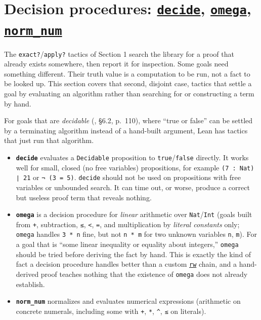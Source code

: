 \section{\texorpdfstring{Decision procedures: \href{https://lean-lang.org/doc/reference/latest/Tactic-Proofs/Tactic-Reference/}{\texttt{decide}}, \href{https://lean-lang.org/doc/reference/latest/Tactic-Proofs/Tactic-Reference/}{\texttt{omega}}, \href{https://lean-lang.org/doc/reference/latest/Tactic-Proofs/Tactic-Reference/}{\texttt{norm\_num}}}{Decision procedures: decide, omega, norm\_num}}\label{sec:13-working-efficiently:02-decision-procedures:1}

The \texttt{exact?}/\texttt{apply?} tactics of Section 1 search the library for a proof that already exists somewhere, then report it for inspection. Some goals need something different. Their truth value is a computation to be run, not a fact to be looked up. This section covers that second, disjoint case, tactics that settle a goal by evaluating an algorithm rather than searching for or constructing a term by hand.

For goals that are \emph{decidable} (\cite{Chlipala2013}, §6.2, p.~110), where ``true or false'' can be settled by a terminating algorithm instead of a hand-built argument, Lean has tactics that just run that algorithm.

\begin{itemize}
\tightlist
\item
  \textbf{\texttt{decide}} evaluates a \texttt{Decidable} proposition to \texttt{true}/\texttt{false} directly. It works well for small, closed (no free variables) propositions, for example \texttt{(7 : Nat) ∣ 21} or \texttt{¬ (3 = 5)}. \texttt{decide} should not be used on propositions with free variables or unbounded search. It can time out, or worse, produce a correct but useless proof term that reveals nothing.
\item
  \textbf{\texttt{omega}} is a decision procedure for \emph{linear} arithmetic over \texttt{Nat}/\texttt{Int} (goals built from \texttt{+}, subtraction, \texttt{≤}, \texttt{<}, \texttt{=}, and multiplication by \emph{literal constants} only; \texttt{omega} handles \texttt{3 * n} fine, but not \texttt{n * m} for two unknown variables \texttt{n}, \texttt{m}). For a goal that is ``some linear inequality or equality about integers,'' \texttt{omega} should be tried before deriving the fact by hand. This is exactly the kind of fact a decision procedure handles better than a custom \href{https://lean-lang.org/doc/reference/latest/Tactic-Proofs/Tactic-Reference/}{\texttt{rw}} chain, and a hand-derived proof teaches nothing that the existence of \texttt{omega} does not already establish.
\item
  \textbf{\texttt{norm\_\allowbreak{}num}} normalizes and evaluates numerical expressions (arithmetic on concrete numerals, including some with \texttt{+}, \texttt{*}, \texttt{\^}, \texttt{≤} on literals).
\end{itemize}

